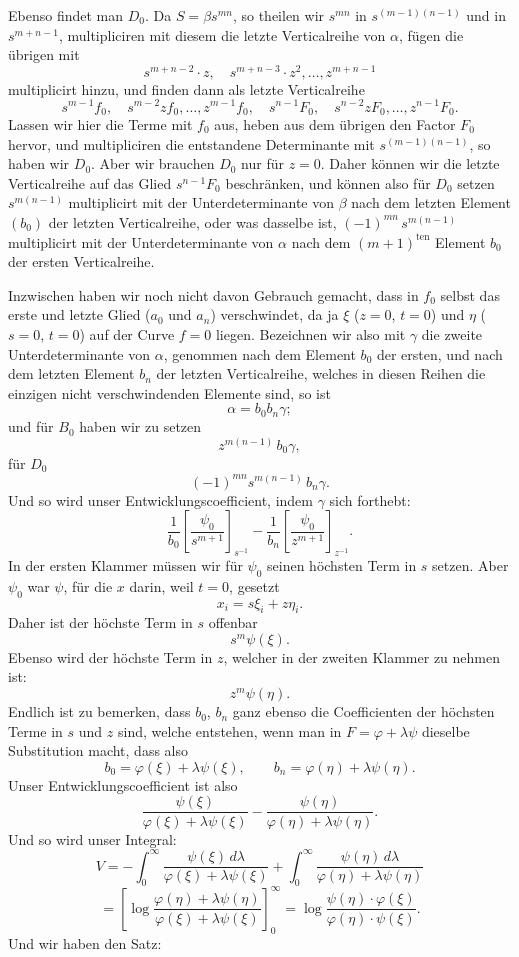 \documentclass[10pt]{article}
\begin{document}
Ebenso findet man $D_0$. Da $S=\beta s^{mn}$, so theilen wir $s^{mn}$ in $s^{(m-1)(n-1)}$ und in $s^{m+n-1}$, multipliciren mit diesem die letzte Verticalreihe von $\alpha$, fügen die übrigen mit
\[
s^{m+n-2}\cdot z,
\quad s^{m+n-3}\cdot z^2,
\ldots,
 z^{m+n-1}
\]
multiplicirt hinzu, und finden dann als letzte Verticalreihe
\[
s^{m-1}f_0,
\quad s^{m-2}zf_0,\ldots,z^{m-1}f_0,
\quad s^{n-1}F_0,
\quad s^{n-2}zF_0,\ldots,z^{n-1}F_0.
\]
Lassen wir hier die Terme mit $f_0$ aus, heben aus dem übrigen den Factor $F_0$ hervor, und multipliciren die entstandene Determinante mit $s^{(m-1)(n-1)}$, so haben wir $D_0$. Aber wir brauchen $D_0$ nur für $z=0$. Daher können wir die letzte Verticalreihe auf das Glied $s^{n-1}F_0$ beschränken, und können also für $D_0$ setzen $s^{m(n-1)}$ multiplicirt mit der Unterdeterminante von $\beta$ nach dem letzten Element $(b_0)$ der letzten Verticalreihe, oder was dasselbe ist, $(-1)^{mn}\,s^{m(n-1)}$ multiplicirt mit der Unterdeterminante von $\alpha$ nach dem $(m+1)^{\text{ten}}$ Element $b_0$ der ersten Verticalreihe.

Inzwischen haben wir noch nicht davon Gebrauch gemacht, dass in $f_0$ selbst das erste und letzte Glied ($a_0$ und $a_n$) verschwindet, da ja $\xi$ ($z=0$, $t=0$) und $\eta$ ($s=0$, $t=0$) auf der Curve $f=0$ liegen. Bezeichnen wir also mit $\gamma$ die zweite Unterdeterminante von $\alpha$, genommen nach dem Element $b_0$ der ersten, und nach dem letzten Element $b_n$ der letzten Verticalreihe, welches in diesen Reihen die einzigen nicht verschwindenden Elemente sind, so ist
\[
\alpha=b_0b_n\gamma;
\]
und für $B_0$ haben wir zu setzen
\[
z^{m(n-1)}\,b_0\gamma,
\]
für $D_0$
\[
(-1)^{mn}s^{m(n-1)}\,b_n\gamma.
\]
Und so wird unser Entwicklungscoefficient, indem $\gamma$ sich forthebt:
\[
\frac{1}{b_0}\left[\frac{\psi_0}{s^{m+1}}\right]_{s^{-1}}
-\frac{1}{b_n}\left[\frac{\psi_0}{z^{m+1}}\right]_{z^{-1}}.
\]
In der ersten Klammer müssen wir für $\psi_0$ seinen höchsten Term in $s$ setzen. Aber $\psi_0$ war $\psi$, für die $x$ darin, weil $t=0$, gesetzt
\[
x_i=s\xi_i+z\eta_i.
\]
Daher ist der höchste Term in $s$ offenbar
\[
s^m\psi(\xi).
\]
Ebenso wird der höchste Term in $z$, welcher in der zweiten Klammer zu nehmen ist:
\[
z^m\psi(\eta).
\]
Endlich ist zu bemerken, dass $b_0$, $b_n$ ganz ebenso die Coefficienten der höchsten Terme in $s$ und $z$ sind, welche entstehen, wenn man in $F=\varphi+\lambda\psi$ dieselbe Substitution macht, dass also
\[
b_0=\varphi(\xi)+\lambda\psi(\xi),
\qquad
b_n=\varphi(\eta)+\lambda\psi(\eta).
\]
Unser Entwicklungscoefficient ist also
\[
\frac{\psi(\xi)}{\varphi(\xi)+\lambda\psi(\xi)}
-\frac{\psi(\eta)}{\varphi(\eta)+\lambda\psi(\eta)}.
\]
Und so wird unser Integral:
\[
V=-\int_0^\infty \frac{\psi(\xi)\,d\lambda}{\varphi(\xi)+\lambda\psi(\xi)}
+\int_0^\infty \frac{\psi(\eta)\,d\lambda}{\varphi(\eta)+\lambda\psi(\eta)}
\]
\[
=\left[\log\frac{\varphi(\eta)+\lambda\psi(\eta)}{\varphi(\xi)+\lambda\psi(\xi)}\right]_0^\infty
=\log\frac{\psi(\eta)\cdot\varphi(\xi)}{\varphi(\eta)\cdot\psi(\xi)}.
\]
Und wir haben den Satz:
\end{document}
